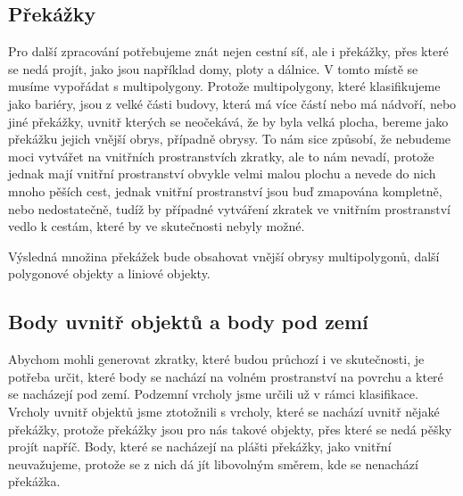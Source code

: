 \subsection{Překážky}
Pro další zpracování potřebujeme znát nejen cestní síť, ale i překážky, přes
které se nedá projít, jako jsou například domy, ploty a dálnice. V tomto místě
se musíme vypořádat s multipolygony. Protože multipolygony, které klasifikujeme
jako bariéry, jsou z velké části budovy, která má více částí nebo má nádvoří,
nebo jiné překážky, uvnitř kterých se neočekává, že by byla velká plocha, bereme
jako překážku jejich vnější obrys, případně obrysy. To nám sice způsobí, že
nebudeme moci vytvářet na vnitřních prostranstvích zkratky, ale to nám nevadí,
protože jednak mají vnitřní prostranství obvykle velmi malou plochu a nevede do
nich mnoho pěších cest, jednak vnitřní prostranství jsou buď zmapována
kompletně, nebo nedostatečně, tudíž by případné vytváření zkratek ve vnitřním
prostranství vedlo k cestám, které by ve skutečnosti nebyly možné.

Výsledná množina překážek bude obsahovat vnější obrysy multipolygonů, další
polygonové objekty a liniové objekty.

\subsection{Body uvnitř objektů a body pod zemí}
Abychom mohli generovat zkratky, které budou průchozí i ve skutečnosti, je
potřeba určit, které body se nachází na volném prostranství na povrchu a které
se nacházejí pod zemí. Podzemní vrcholy jsme určili už v rámci klasifikace.
Vrcholy uvnitř objektů jsme ztotožnili s vrcholy, které se nachází uvnitř nějaké
překážky, protože překážky jsou pro nás takové objekty, přes které se nedá pěšky
projít napříč. Body, které se nacházejí na plášti překážky, jako vnitřní
neuvažujeme, protože se z nich dá jít libovolným směrem, kde se nenachází
překážka.

